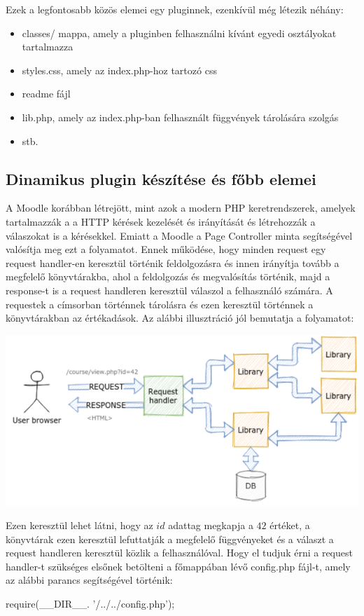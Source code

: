 Ezek a legfontosabb közös elemei egy pluginnek, ezenkívül még létezik néhány:
\begin{itemize}
    \item classes/ mappa, amely a pluginben felhasználni kívánt egyedi osztályokat tartalmazza
    \item styles.css, amely az index.php-hoz tartozó css
    \item readme fájl
    \item lib.php, amely az index.php-ban felhasznált függvények tárolására szolgás
    \item stb.
\end{itemize}

\subsection{Dinamikus plugin készítése és főbb elemei}

A Moodle korábban létrejött, mint azok a modern PHP keretrendszerek, amelyek tartalmazzák a a HTTP kérések kezelését és irányítását és létrehozzák a válaszokat is a kérésekkel. Emiatt a Moodle a Page Controller minta segítségével valósítja meg ezt a folyamatot. Ennek működése, hogy minden request egy request handler-en keresztül történik feldolgozásra és innen irányítja tovább a megfelelő könyvtárakba, ahol a feldolgozás és megvalósítás történik, majd a response-t is a request handleren keresztül válaszol a felhasználó számára. A requestek a címsorban történnek tárolásra és ezen keresztül történnek a könyvtárakban az értékadások. Az alábbi illusztráció jól bemutatja a folyamatot:
\begin{center}
    \includegraphics[scale=0.8]{Fejezetek/Images/requestHandler.png}
\end{center}

Ezen keresztül lehet látni, hogy az $id$ adattag megkapja a $42$ értéket, a könyvtárak ezen keresztül lefuttatják a megfelelő függvényeket és a választ a request handleren keresztül közlik a felhasználóval. Hogy el tudjuk érni a request handler-t szükséges elsőnek betölteni a főmappában lévő config.php fájl-t, amely az alábbi parancs segítségével történik: \par
\hfill \break
require(\_\_DIR\_\_. '/../../config.php');
\hfill \break

